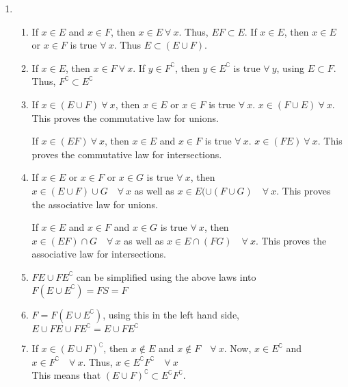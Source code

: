 \begin{enumerate}
	
	\item \begin{enumerate}
		
		\item If $ x \in E $ and $ x \in F $, then $ x \in E \ \forall\  x $. Thus, $ EF \subset E $.
		If $ x \in E $, then $ x \in E $ or $ x \in F $ is true $ \forall \ x $. Thus $ E \subset (E \cup F) $.
		
		\item If $ x \in E $, then $ x \in F \ \forall \ x$.
		If  $ y \in F^\complement $, then $ y \in E^\complement $ is true $ \forall \ y $, using $ E \subset F $. Thus, $ F^\complement \subset E^\complement $ \\
		
		\item If $ x \in (E \cup F) \ \forall\ x$, then $ x \in E $ or $ x \in F $ is true $ \forall \ x $.
		$ x \in (F \cup E) \ \forall\ x$. This proves the commutative law for unions.
		
		If $ x \in (E F) \ \forall\ x$, then $ x \in E $ and $ x \in F $ is true $ \forall \ x $.
		$ x \in (F  E) \ \forall\ x$. This proves the commutative law for intersections.
		
		\item If $ x \in E $ or $ x \in F $ or $ x \in G $ is true $ \forall \ x $, then \\
		$ x \in (E \cup F) \cup G \quad \forall \ x$ as well as $ x \in E(\cup (F \cup G) \quad \forall \ x$.
		This proves the associative law for unions.
		
		If $ x \in E $ and $ x \in F $ and $ x \in G $ is true $ \forall \ x $, then \\
		$ x \in (E F) \cap G \quad \forall \ x$ as well as $ x \in E \cap (F G) \quad \forall \ x$.
		This proves the associative law for intersections.
		
		\item $ FE \cup FE^\complement $ can be simplified using the above laws into \\
		$ F (E \cup E^\complement) = F S = F$ \\
		
		\item $ F = F (E \cup E^\complement) $, using this in the left hand side,
		$ E \cup FE \cup FE^\complement = E \cup F E^\complement$ \\
		
		\item If $ x \in (E \cup F)^\complement $, then $ x \notin E $ and $ x \notin F  \quad \forall \ x$.
		Now, $ x \in E^\complement $ and $ x \in F^\complement  \quad \forall \ x$. Thus, $ x \in E^\complement F^\complement \quad \forall \ x $ \\
		This means that $ (E \cup F)^\complement \subset E^\complement F^\complement $.
		

\end{enumerate}
\end{enumerate}
